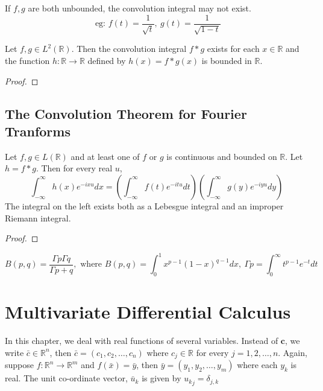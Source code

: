 \begin{remark}
	If $f,g$ are both unbounded, the convolution integral may not exist.
	\[ \text{ eg: } f(t) = \frac{1}{\sqrt{t}},\ g(t) = \frac{1}{\sqrt{1-t}} \]
\end{remark}

\begin{theorem}
	Let \( f,g \in L^2(\mathbb{R}) \).
	Then the convolution integral $f \ast g$ exists for each \( x \in \mathbb{R} \) and the function \( h : \mathbb{R} \to \mathbb{R} \) defined by \( h(x) = f \ast g (x) \) is bounded in $\mathbb{R}$.
\end{theorem}
\begin{synopsis}
\end{synopsis}
\begin{proof}
\end{proof}

\subsection{The Convolution Theorem for Fourier Tranforms}
\begin{theorem}
	Let \( f,g \in L(\mathbb{R}) \) and at least one of $f$ or $g$ is continuous and bounded on $\mathbb{R}$.
	Let \( h = f \ast g \).
	Then for every real $u$,
	\[ \int_{-\infty}^\infty h(x) e^{-ixu} dx = \left( \int_{-\infty}^\infty f(t) e^{-itu} dt \right) \left( \int_{-\infty}^\infty g(y) e^{-iyu} dy \right) \]
	The integral on the left exists both as a Lebesgue integral and an improper Riemann integral.
\end{theorem}
\begin{synopsis}
\end{synopsis}
\begin{proof}
\end{proof}

\begin{remark}
	\[ B(p,q) = \frac{\Gamma{p} \Gamma{q}}{\Gamma{p+q}},\text{ where } B(p,q) = \int_0^1 x^{p-1} (1-x)^{q-1} dx,\ \Gamma{p} = \int_0^\infty t^{p-1} e^{-t} dt \]
\end{remark}

\section{Multivariate Differential Calculus}

In this chapter, we deal with real functions of several variables.
Instead of $\mathbf{c}$, we write \( \bar{c} \in \mathbb{R}^n \), then \( \bar{c} = (c_1, c_2, \dots, c_n) \) where \( c_j \in \mathbb{R} \) for every \(j = 1,2, \dots, n\).
Again, suppose \(f : \mathbb{R}^n \to \mathbb{R}^m\) and \(f(\bar{x}) = \bar{y}\), then \(\bar{y} = (y_1, y_2, \dots, y_m)\) where each $y_k$ is real.
The unit co-ordinate vector, $\bar{u}_k$ is given by \( {u_k}_j = \delta_{j,k} \)

